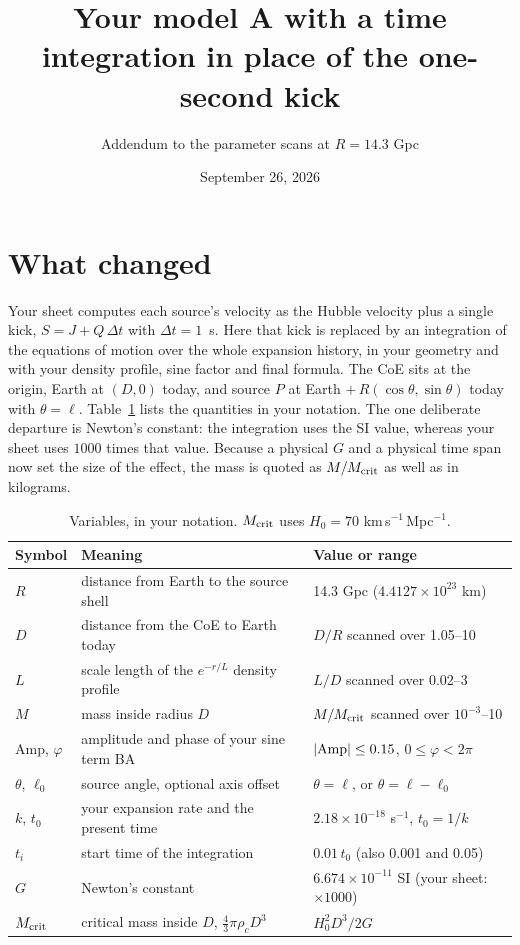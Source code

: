 \documentclass[10pt,letterpaper]{article}
\title{\vspace{-1.2cm}Your model A with a time integration in place of the one-second kick}
\author{Addendum to the parameter scans at $R=14.3$ Gpc}
\date{September 26, 2026}
\begin{document}
\maketitle\vspace{-0.8cm}

\section{What changed}
Your sheet computes each source's velocity as the Hubble velocity plus a single kick, $S=J+Q\,\Delta t$ with $\Delta t=1$~s. Here that kick is replaced by an integration of the equations of motion over the whole expansion history, in your geometry and with your density profile, sine factor and final formula. The CoE sits at the origin, Earth at $(D,0)$ today, and source $P$ at Earth $+\,R(\cos\theta,\sin\theta)$ today with $\theta=\ell$. Table~\ref{tab:vars} lists the quantities in your notation. The one deliberate departure is Newton's constant: the integration uses the SI value, whereas your sheet uses $1000$ times that value. Because a physical $G$ and a physical time span now set the size of the effect, the mass is quoted as $M/M_{\rm crit}$ as well as in kilograms.

\begin{table}[H]\centering\small
\caption{Variables, in your notation. $M_{\rm crit}$ uses $H_0=70$ km\,s$^{-1}$\,Mpc$^{-1}$.}\label{tab:vars}
\begin{tabular}{lll}\toprule
Symbol & Meaning & Value or range\\\midrule
$R$ & distance from Earth to the source shell & 14.3 Gpc ($4.4127\times10^{23}$ km)\\
$D$ & distance from the CoE to Earth today & $D/R$ scanned over 1.05--10\\
$L$ & scale length of the $e^{-r/L}$ density profile & $L/D$ scanned over 0.02--3\\
$M$ & mass inside radius $D$ & $M/M_{\rm crit}$ scanned over $10^{-3}$--10\\
Amp, $\varphi$ & amplitude and phase of your sine term BA & $|{\rm Amp}|\le0.15$, $0\le\varphi<2\pi$\\
$\theta$, $\ell_0$ & source angle, optional axis offset & $\theta=\ell$, or $\theta=\ell-\ell_0$\\
$k$, $t_0$ & your expansion rate and the present time & $2.18\times10^{-18}$ s$^{-1}$, $t_0=1/k$\\
$t_i$ & start time of the integration & $0.01\,t_0$ (also 0.001 and 0.05)\\
$G$ & Newton's constant & $6.674\times10^{-11}$ SI (your sheet: $\times1000$)\\
$M_{\rm crit}$ & critical mass inside $D$, $\tfrac{4}{3}\pi\rho_cD^3$ & $H_0^2D^3/2G$\\\bottomrule
\end{tabular}\end{table}
\end{document}
